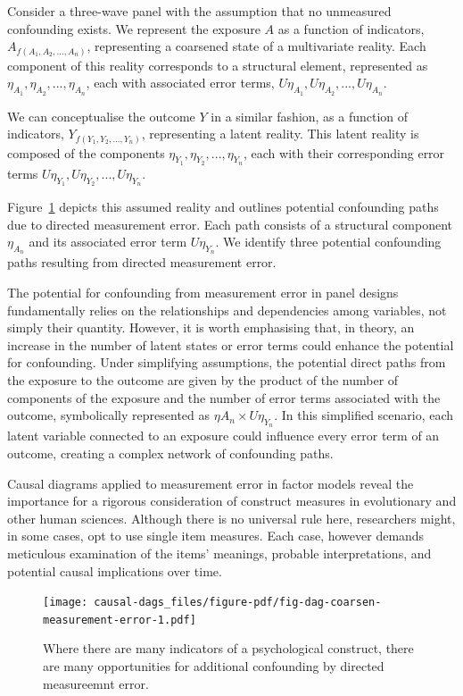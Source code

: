 \documentclass[
  singlecolumn]{report}
\begin{document}
Consider a three-wave panel with the assumption that no unmeasured
confounding exists. We represent the exposure \(A\) as a function of
indicators, \(A_{f(A_1, A_2, ..., A_n)}\), representing a coarsened
state of a multivariate reality. Each component of this reality
corresponds to a structural element, represented as
\(\eta_{A_1}, \eta_{A_2}, ..., \eta_{A_n}\), each with associated error
terms, \(U\eta_{A_1}, U\eta_{A_2}, ..., U\eta_{A_n}\).

We can conceptualise the outcome \(Y\) in a similar fashion, as a
function of indicators, \(Y_{f(Y_1, Y_2, ..., Y_n)}\), representing a
latent reality. This latent reality is composed of the components
\(\eta_{Y_1}, \eta_{Y_2}, ..., \eta_{Y_n}\), each with their
corresponding error terms
\(U\eta_{Y_1}, U\eta_{Y_2}, ..., U\eta_{Y_n}\).

Figure~\ref{fig-dag-coarsen-measurement-error} depicts this assumed
reality and outlines potential confounding paths due to directed
measurement error. Each path consists of a structural component
\(\eta_{A_n}\) and its associated error term \(U\eta_{Y_n}\). We
identify three potential confounding paths resulting from directed
measurement error.

The potential for confounding from measurement error in panel designs
fundamentally relies on the relationships and dependencies among
variables, not simply their quantity. However, it is worth emphasising
that, in theory, an increase in the number of latent states or error
terms could enhance the potential for confounding. Under simplifying
assumptions, the potential direct paths from the exposure to the outcome
are given by the product of the number of components of the exposure and
the number of error terms associated with the outcome, symbolically
represented as \(\eta A_n \times U\eta_{Y_n}\). In this simplified
scenario, each latent variable connected to an exposure could influence
every error term of an outcome, creating a complex network of
confounding paths.

Causal diagrams applied to measurement error in factor models reveal the
importance for a rigorous consideration of construct measures in
evolutionary and other human sciences. Although there is no universal
rule here, researchers might, in some cases, opt to use single item
measures. Each case, however demands meticulous examination of the
items' meanings, probable interpretations, and potential causal
implications over time.

\begin{figure}

{\centering \texttt{[image: causal-dags\_files/figure-pdf/fig-dag-coarsen-measurement-error-1.pdf]}

}

\caption{\label{fig-dag-coarsen-measurement-error}Where there are many
indicators of a psychological construct, there are many opportunities
for additional confounding by directed measureemnt error.}

\end{figure}
\end{document}
